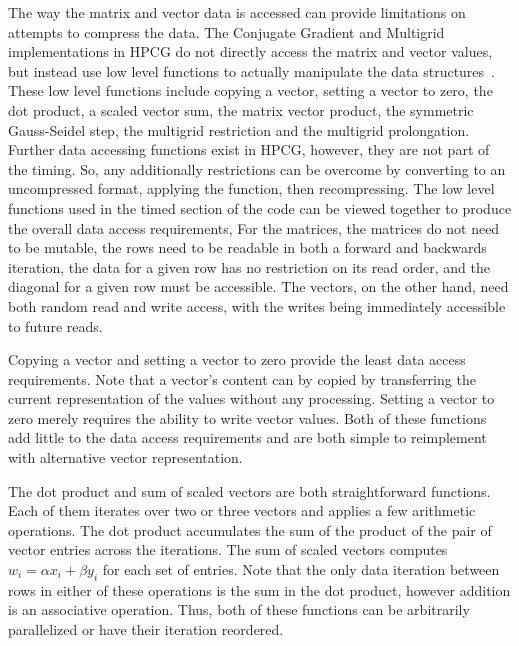 The way the matrix and vector data is accessed can provide limitations on attempts to compress the data.
The Conjugate Gradient and Multigrid implementations in HPCG do not directly access the matrix and vector values, but instead use low level functions to actually manipulate the data structures~\cite{Dongarra:2015:HPCG}.
These low level functions include copying a vector, setting a vector to zero, the dot product, a scaled vector sum, the matrix vector product, the symmetric Gauss-Seidel step, the multigrid restriction and the multigrid prolongation.
Further data accessing functions exist in HPCG, however, they are not part of the timing.
So, any additionally restrictions can be overcome by converting to an uncompressed format, applying the function, then recompressing.
The low level functions used in the timed section of the code can be viewed together to produce the overall data access requirements,
For the matrices, the matrices do not need to be mutable, the rows need to be readable in both a forward and backwards iteration, the data for a given row has no restriction on its read order, and the diagonal for a given row must be accessible.
The vectors, on the other hand, need both random read and write access, with the writes being immediately accessible to future reads.


Copying a vector and setting a vector to zero provide the least data access requirements.
Note that a vector's content can by copied by transferring the current representation of the values without any processing.
Setting a vector to zero merely requires the ability to write vector values.
Both of these functions add little to the data access requirements and are both simple to reimplement with alternative vector representation.

The dot product and sum of scaled vectors are both straightforward functions.
Each of them iterates over two or three vectors and applies a few arithmetic operations.
The dot product accumulates the sum of the product of the pair of vector entries across the iterations.
The sum of scaled vectors computes \(w_i = \alpha x_i + \beta y_i\) for each set of entries.
Note that the only data iteration between rows in either of these operations is the sum in the dot product, however addition is an associative operation.
Thus, both of these functions can be arbitrarily parallelized or have their iteration reordered.

